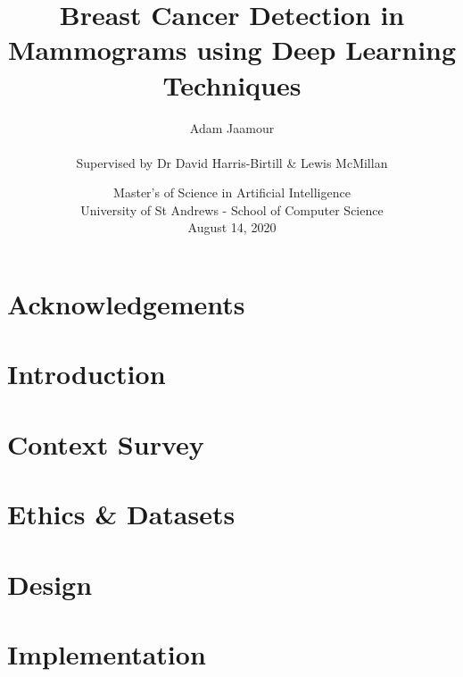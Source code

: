 \documentclass[11pt,oneside,a4paper]{report} %
\title{Breast Cancer Detection in Mammograms using Deep Learning Techniques}
\author{Adam Jaamour\\~\\Supervised by Dr David Harris-Birtill \& Lewis McMillan}
\date{Master's of Science in Artificial Intelligence\\University of St Andrews - School of Computer Science\\August 14, 2020}
\begin{document}
\setcounter{page}{0}

\maketitle
\newpage

\newpage

\abstract

\newpage

\setcounter{tocdepth}{3}
\tableofcontents
\newpage
\listoffigures
\newpage
\listoftables
\newpage

\printnomenclature 
\newpage

\chapter*{Acknowledgements}

\newpage


\setcounter{page}{1}

\chapter{Introduction}
\label{ch:chapter-intro}


\chapter{Context Survey}
\label{ch:chapter-litsurvey}


\chapter{Ethics \& Datasets}
\label{ch:chapter-ethics-datasets}


\chapter{Design}
\label{ch:chapter-design}


\chapter{Implementation}
\label{ch:chapter-implementation}

\end{document}
